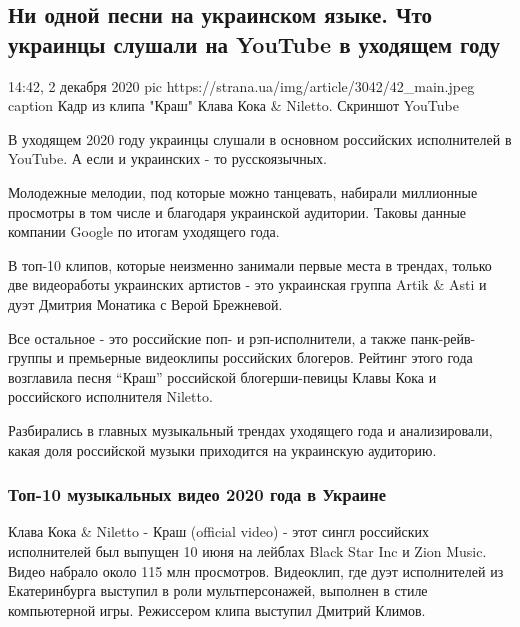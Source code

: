  
 
 
 
 

\subsection{Ни одной песни на украинском языке. Что украинцы слушали на YouTube в уходящем году}

14:42, 2 декабря 2020
\ifcmt
pic https://strana.ua/img/article/3042/42_main.jpeg
caption Кадр из клипа "Краш" Клава Кока \& Niletto. Скриншот YouTube 
\fi

В уходящем 2020 году украинцы слушали в основном российских исполнителей в
YouTube. А если и украинских - то русскоязычных.

Молодежные мелодии, под которые можно танцевать, набирали миллионные
просмотры в том числе и благодаря украинской аудитории. Таковы данные
компании Google по итогам уходящего года. 

В топ-10 клипов, которые неизменно занимали первые места в трендах, только
две видеоработы украинских артистов - это украинская группа Artik \& Asti и
дуэт Дмитрия Монатика с Верой Брежневой. 

Все остальное - это российские поп- и рэп-исполнители, а также панк-рейв-группы
и премьерные видеоклипы российских блогеров. Рейтинг этого года возглавила
песня \enquote{Краш} российской блогерши-певицы Клавы Кока и российского исполнителя
Niletto.

Разбирались в главных музыкальный трендах уходящего года и анализировали,
какая доля российской музыки приходится на украинскую аудиторию.

\subsubsection{Топ-10 музыкальных видео 2020 года в Украине}

Клава Кока \& Niletto - Краш (official video) - этот сингл
российских исполнителей был выпущен 10 июня на лейблах Black Star Inc и
Zion Music. Видео набрало около 115 млн просмотров. Видеоклип, где дуэт
исполнителей из Екатеринбурга выступил в роли мультперсонажей, выполнен в
стиле компьютерной игры. Режиссером клипа выступил Дмитрий Климов. 

